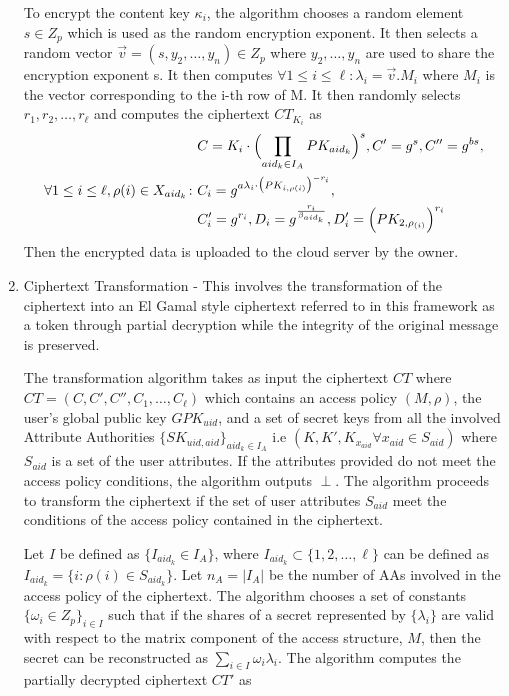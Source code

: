 \begin{enumerate}
	To encrypt the content key $\kappa_{i}$, the algorithm chooses a random element $ s \in Z_{p} $ which is used as the random encryption exponent. It then selects a random vector $ \vec{v} = (s, y_{2},\ldots,y_{n}) \in Z_{p} $ where $ y_{2},\ldots,y_{n} $ are used to share the encryption exponent s. It then computes $ \forall 1 \leq i \leq \ell: \lambda_{i} = \vec{v}.M_{i} $ where $ M_{i} $ is the vector corresponding to the i-th row of M. It then randomly selects $ r_{1},r_{2},\ldots,r_{\ell} $ and computes the ciphertext $CT_{K_{i}}$ as	
	\begin{align*}
	&C = K_{i}\cdot\Bigl(\prod\limits_{aid_{k} \in I_{A}}PK_{aid_{k}}\Bigl)^{s}, C' = g^{s}, C'' = g^{bs},\\
	\forall 1 \leq i \leq \ell, \rho(i) \in X_{aid_{k}} \colon &C_{i} = g^{a\lambda_{i}\cdot\bigl(PK_{i,\rho(i)}\bigl)^{-r_{i}}},\\ &C'_{i} = g^{r_{i}},D_{i} = g^{\frac{r_{i}}{\beta_{aid_k}}}, D'_{i} = \Bigl(PK_{2,\rho_{(i)}}\Bigl)^{r_{i}}
	\end{align*}
	Then the encrypted data is uploaded to the cloud server by the owner.
	
	\item Ciphertext Transformation - This involves the transformation of the ciphertext into an El Gamal style ciphertext referred to in this framework as a token through partial decryption while the integrity of the original message is preserved.
	
	The transformation algorithm takes as input the ciphertext $CT$ where $CT = (C, C', C'', C_1,\ldots,C_\ell)$ which contains an access policy $(M,\rho)$, the user's global public key $GPK_{uid}$, and a set of secret keys from all the involved Attribute Authorities $\{SK_{uid,aid}\}_{aid_k \in I_{A}}$ i.e $(K, K', K_{x_{aid}} \forall x_{aid} \in S_{aid})$ where $S_{aid}$ is a set of the user attributes. If the attributes provided do not meet the access policy conditions, the algorithm outputs $\perp$. The algorithm proceeds to transform the ciphertext if the set of user attributes $S_{aid}$ meet the conditions of the access policy contained in the ciphertext.
	
	Let $I$ be defined as $\{I_{aid_k} \in I_{A}\}$, where $I_{aid_k} \subset \{1,2,\ldots,\ell\}$ can be defined as $I_{aid_k} = \{i: \rho(i) \in S_{aid_k}\}$. Let $n_A = |I_A|$ be the number of AAs  involved in the access policy of the ciphertext. The algorithm chooses a set of constants $\{\omega_{i} \in Z_p\}_{i \in I}$ such that if the shares of a secret represented by $\{\lambda_{i}\}$ are valid with respect to the matrix component of the access structure, $M$, then the secret can be reconstructed as $\sum_{i \in I}\omega_{i}\lambda_{i}$. The algorithm computes the partially decrypted ciphertext $CT'$ as
	

\end{enumerate}
